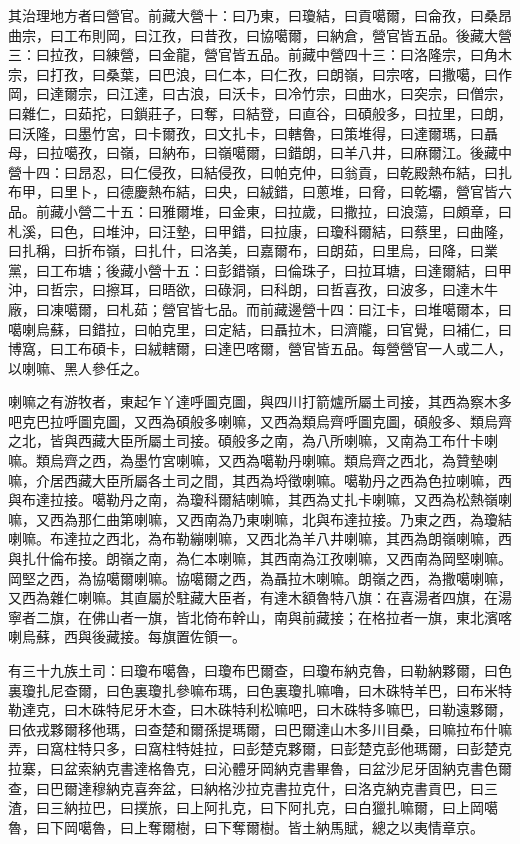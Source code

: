 \begin{pinyinscope}
其治理地方者曰營官。前藏大營十：曰乃東，曰瓊結，曰貢噶爾，曰侖孜，曰桑昂曲宗，曰工布則岡，曰江孜，曰昔孜，曰協噶爾，曰納倉，營官皆五品。後藏大營三：曰拉孜，曰練營，曰金龍，營官皆五品。前藏中營四十三：曰洛隆宗，曰角木宗，曰打孜，曰桑葉，曰巴浪，曰仁本，曰仁孜，曰朗嶺，曰宗喀，曰撒噶，曰作岡，曰達爾宗，曰江達，曰古浪，曰沃卡，曰冷竹宗，曰曲水，曰突宗，曰僧宗，曰雜仁，曰茹拕，曰鎖莊子，曰奪，曰結登，曰直谷，曰碩般多，曰拉里，曰朗，曰沃隆，曰墨竹宮，曰卡爾孜，曰文扎卡，曰轄魯，曰策堆得，曰達爾瑪，曰聶母，曰拉噶孜，曰嶺，曰納布，曰嶺噶爾，曰錯朗，曰羊八井，曰麻爾江。後藏中營十四：曰昂忍，曰仁侵孜，曰結侵孜，曰帕克仲，曰翁貢，曰乾殿熱布結，曰扎布甲，曰里卜，曰德慶熱布結，曰央，曰絨錯，曰蔥堆，曰脅，曰乾壩，營官皆六品。前藏小營二十五：曰雅爾堆，曰金東，曰拉歲，曰撒拉，曰浪蕩，曰頗章，曰札溪，曰色，曰堆沖，曰汪墊，曰甲錯，曰拉康，曰瓊科爾結，曰蔡里，曰曲隆，曰扎稱，曰折布嶺，曰扎什，曰洛美，曰嘉爾布，曰朗茹，曰里烏，曰降，曰業黨，曰工布塘；後藏小營十五：曰彭錯嶺，曰倫珠子，曰拉耳塘，曰達爾結，曰甲沖，曰哲宗，曰擦耳，曰晤欲，曰碌洞，曰科朗，曰哲喜孜，曰波多，曰達木牛廠，曰凍噶爾，曰札茹；營官皆七品。而前藏邊營十四：曰江卡，曰堆噶爾本，曰噶喇烏蘇，曰錯拉，曰帕克里，曰定結，曰聶拉木，曰濟隴，曰官覺，曰補仁，曰博窩，曰工布碩卡，曰絨轄爾，曰達巴喀爾，營官皆五品。每營營官一人或二人，以喇嘛、黑人參任之。

喇嘛之有游牧者，東起乍丫達呼圖克圖，與四川打箭爐所屬土司接，其西為察木多吧克巴拉呼圖克圖，又西為碩般多喇嘛，又西為類烏齊呼圖克圖，碩般多、類烏齊之北，皆與西藏大臣所屬土司接。碩般多之南，為八所喇嘛，又南為工布什卡喇嘛。類烏齊之西，為墨竹宮喇嘛，又西為噶勒丹喇嘛。類烏齊之西北，為贊墊喇嘛，介居西藏大臣所屬各土司之間，其西為埒徵喇嘛。噶勒丹之西為色拉喇嘛，西與布達拉接。噶勒丹之南，為瓊科爾結喇嘛，其西為丈扎卡喇嘛，又西為松熱嶺喇嘛，又西為那仁曲第喇嘛，又西南為乃東喇嘛，北與布達拉接。乃東之西，為瓊結喇嘛。布達拉之西北，為布勒繃喇嘛，又西北為羊八井喇嘛，其西為朗嶺喇嘛，西與扎什倫布接。朗嶺之南，為仁本喇嘛，其西南為江孜喇嘛，又西南為岡堅喇嘛。岡堅之西，為協噶爾喇嘛。協噶爾之西，為聶拉木喇嘛。朗嶺之西，為撒噶喇嘛，又西為雜仁喇嘛。其直屬於駐藏大臣者，有達木額魯特八旗：在喜湯者四旗，在湯寧者二旗，在佛山者一旗，皆北倚布幹山，南與前藏接；在格拉者一旗，東北濱喀喇烏蘇，西與後藏接。每旗置佐領一。

有三十九族土司：曰瓊布噶魯，曰瓊布巴爾查，曰瓊布納克魯，曰勒納夥爾，曰色裏瓊扎尼查爾，曰色裏瓊扎參嘛布瑪，曰色裏瓊扎嘛嚕，曰木硃特羊巴，曰布米特勒達克，曰木硃特尼牙木查，曰木硃特利松嘛吧，曰木硃特多嘛巴，曰勒遠夥爾，曰依戎夥爾移他瑪，曰查楚和爾孫提瑪爾，曰巴爾達山木多川目桑，曰嘛拉布什嘛弄，曰窩柱特只多，曰窩柱特娃拉，曰彭楚克夥爾，曰彭楚克彭他瑪爾，曰彭楚克拉寨，曰盆索納克書達格魯克，曰沁體牙岡納克書畢魯，曰盆沙尼牙固納克書色爾查，曰巴爾達穆納克喜奔盆，曰納格沙拉克書拉克什，曰洛克納克書貢巴，曰三渣，曰三納拉巴，曰撲旅，曰上阿扎克，曰下阿扎克，曰白獵扎嘛爾，曰上岡噶魯，曰下岡噶魯，曰上奪爾樹，曰下奪爾樹。皆土納馬賦，總之以夷情章京。


\end{pinyinscope}
